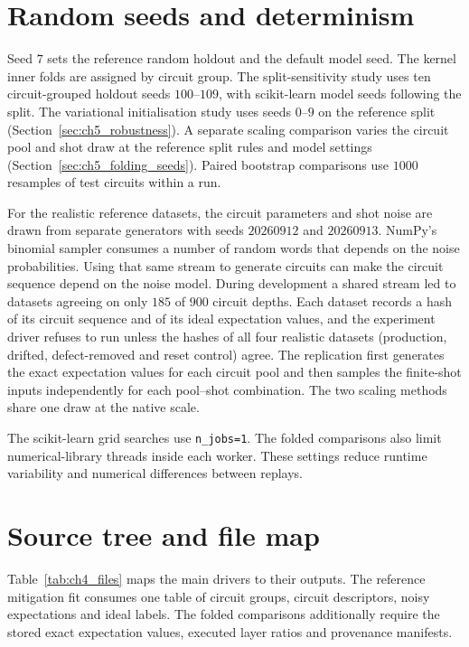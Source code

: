 \documentclass[Thesis.tex]{subfiles}
\begin{document}
\section{Random seeds and determinism}

Seed $7$ sets the reference random holdout and the default model seed. The
kernel inner folds are assigned by circuit group. The split-sensitivity study uses ten
circuit-grouped holdout seeds $100$--$109$, with scikit-learn model seeds following
the split. The variational initialisation study uses seeds $0$--$9$ on the
reference split (Section~\ref{sec:ch5_robustness}). A separate scaling comparison
varies the circuit pool and shot draw at the reference split rules and model
settings (Section~\ref{sec:ch5_folding_seeds}). Paired bootstrap comparisons use
$1000$ resamples of test circuits within a run. 

For the realistic reference datasets, the circuit parameters and shot noise
are drawn from separate generators with seeds $20260912$ and $20260913$.
NumPy's binomial sampler consumes a number of random words that depends on
the noise probabilities. Using that same stream to generate circuits can make
the circuit sequence depend on the noise model. During development a shared
stream led to datasets agreeing on only $185$ of $900$ circuit depths. Each dataset
records a hash of its circuit sequence and of its ideal expectation values, and the
experiment driver refuses to run unless the hashes of all four realistic datasets
(production, drifted, defect-removed and reset control) agree.
The replication first generates the exact expectation values for each circuit
pool and then samples the finite-shot inputs independently for each pool--shot
combination. The two scaling methods share one draw at the native scale.



The scikit-learn grid searches use \texttt{n\_jobs=1}. The folded
comparisons also limit numerical-library threads inside each worker.
These settings reduce runtime variability and numerical differences between
replays.

\section{Source tree and file map}

Table~\ref{tab:ch4_files} maps the main drivers to their outputs. The reference
mitigation fit consumes one table of circuit groups, circuit descriptors,
noisy expectations and ideal labels. The folded comparisons additionally
require the stored exact expectation values, executed layer ratios and provenance
manifests.
\end{document}
